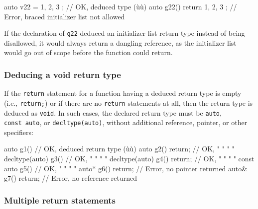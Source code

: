 \begin{emcppslisting}
auto v22 = { 1, 2, 3 };            // OK, deduced type (ù{}ù)
auto g22() { return { 1, 2, 3 }; } // Error, braced initializer list not allowed
\end{emcppslisting}
    

\noindent If the declaration of \lstinline!g22! deduced an initializer list return
type instead of being disallowed, it would always return a dangling
reference, as the initializer list would go out of scope before the
function could return.

\subsubsection[Deducing a \lstinline!void! return type]{Deducing a {\SubsubsecCode void} return type}\label{deducing-a-void-return-type}

If the \lstinline!return! statement for a function having a deduced return
type is empty (i.e., \lstinline!return;!) or if there are no
\lstinline!return! statements at all, then the return type is deduced as
\lstinline!void!. In such cases, the declared return type must be
\lstinline!auto!, \lstinline!const!~\lstinline!auto!, or \lstinline!decltype(auto)!,
without additional reference, pointer, or other specifiers:

\begin{emcppslisting}
auto           g1() { }          // OK, deduced return type (ù{}ù)
auto           g2() { return; }  // OK,    "       "     "     "
decltype(auto) g3() { }          // OK,    "       "     "     "
decltype(auto) g4() { return; }  // OK,    "       "     "     "
const auto     g5() { }          // OK,    "       "     "     "
auto*          g6() { return; }  // Error, no pointer returned
auto&          g7() { return; }  // Error, no reference returned
\end{emcppslisting}
    

\subsubsection[Multiple \lstinline!return! statements]{Multiple {\SubsubsecCode return} statements}\label{multiple-return-statements}


